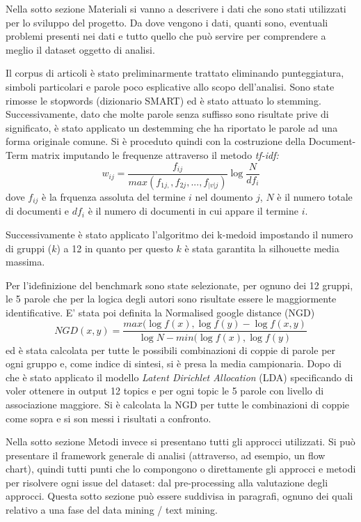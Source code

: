 \documentclass[]{article}
\begin{document}
Nella sotto sezione Materiali si vanno a descrivere i dati che sono stati utilizzati per lo sviluppo del progetto. Da dove vengono i dati, quanti sono, eventuali problemi presenti nei dati e tutto quello che pu\`o servire per comprendere a meglio il dataset oggetto di analisi.

Il corpus di articoli è stato preliminarmente trattato eliminando punteggiatura, simboli particolari e parole poco esplicative allo scopo dell'analisi. Sono state rimosse le stopwords (dizionario SMART) ed è stato attuato lo stemming. Successivamente, dato che molte parole senza suffisso sono risultate prive di significato, è stato applicato un destemming che ha riportato le parole ad una forma originale comune.
Si è proceduto quindi con la costruzione della Document-Term matrix imputando le frequenze attraverso il metodo \textit{tf-idf:}\[ w_{ij}=\frac{f_{ij}}{max({f_{1j,},f_{2j},...,f_{|v|j}})} \log{\frac{N}{df_{i}}}\]
dove $f_{ij}$ è la frquenza assoluta del termine $i$ nel doumento $j$, $N$ è il numero totale di documenti e $df_{i}$ è il numero di documenti in cui appare il termine $i$.

Successivamente è stato applicato l'algoritmo dei k-medoid impostando il numero di gruppi ($k$) a 12 in quanto per questo $k$ è stata garantita la silhouette media massima. 



Per l'idefinizione del benchmark sono state selezionate, per ognuno dei 12 gruppi, le 5 parole che per la logica degli autori sono risultate essere le maggiormente identificative. E' stata poi definita la Normalised google distance (NGD) \[NGD(x,y)=\frac{max(\log f(x),\log f(y)-\log f(x,y)}{\log N-min(\log f(x),\log f(y)} \]
ed è stata calcolata per tutte le possibili combinazioni di coppie di parole per ogni gruppo e, come indice di sintesi, si è presa la media campionaria.
Dopo di che è stato applicato il modello \textit{Latent Dirichlet Allocation} (LDA) specificando di voler ottenere in output 12 topics e per ogni topic le 5 parole con livello di associazione maggiore. Si è calcolata la NGD per tutte le combinazioni di coppie come sopra e si son messi i risultati a confronto.

Nella sotto sezione Metodi invece si presentano tutti gli approcci utilizzati. Si pu\`o presentare il framework generale di analisi (attraverso, ad esempio, un flow chart), quindi tutti punti che lo compongono o direttamente gli approcci e metodi per risolvere ogni issue del dataset: dal pre-processing alla valutazione degli approcci. Questa sotto sezione pu\`o essere suddivisa in paragrafi, ognuno dei quali relativo a una fase del data mining / text mining.
\end{document}
